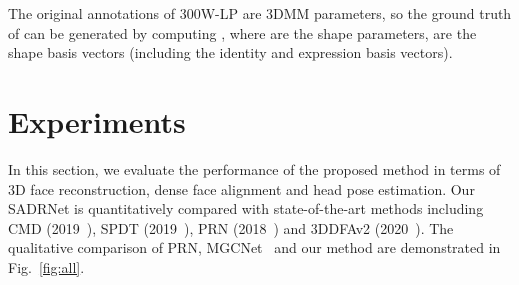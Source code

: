 \documentclass[journal]{IEEEtran}
\begin{document}
	The original annotations of 300W-LP are 3DMM parameters, so the ground truth of  can be generated by computing , where  are the shape parameters,  are the shape basis vectors (including the identity and expression basis vectors).
	
	
	
	\section{Experiments}
	In this section, we evaluate the performance of the proposed method in terms of 3D face reconstruction, dense face alignment and head pose estimation. Our SADRNet is quantitatively compared with state-of-the-art methods including CMD (2019~\cite{FPS}), SPDT (2019~\cite{semi_2019_ICCV}), PRN (2018~\cite{PRN}) and 3DDFAv2 (2020~\cite{3ddfav2}).
	The qualitative comparison of PRN, MGCNet~\cite{MGC} and our method are demonstrated in Fig.~\ref{fig:all}.
	
\end{document}
